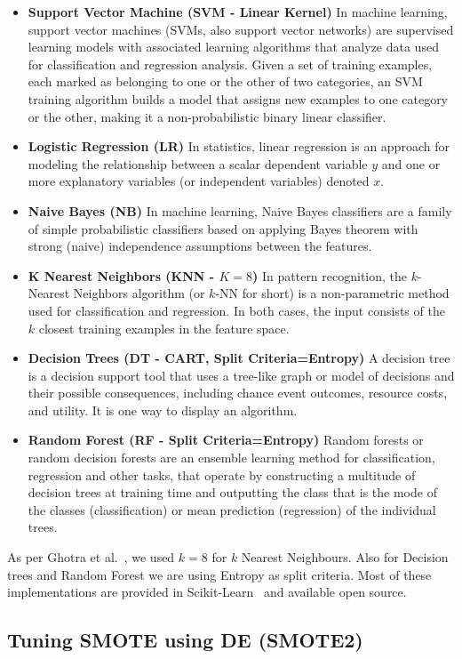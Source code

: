 \documentclass[sigconf,review, anonymous]{acmart}
\newcommand{\bi}{\begin{itemize}[leftmargin=0.4cm]}
\newcommand{\ei}{\end{itemize}}
\theoremstyle{break}
\theoremstyle{break}
\begin{document}
\bi
 \item \textbf{Support Vector Machine (SVM - Linear Kernel)}
 In machine learning, support vector machines (SVMs, also support vector networks) are supervised learning models with associated learning algorithms that analyze data used for classification and regression analysis. Given a set of training examples, each marked as belonging to one or the other of two categories, an SVM training algorithm builds a model that assigns new examples to one category or the other, making it a non-probabilistic binary linear classifier.
 \item \textbf{Logistic Regression (LR)}
 In statistics, linear regression is an approach for modeling the relationship between a scalar dependent variable $y$ and one or more explanatory variables (or independent variables) denoted $x$.
 \item \textbf{Naive Bayes (NB)}
 In machine learning, Naive Bayes classifiers are a family of simple probabilistic classifiers based on applying Bayes theorem with strong (naive) independence assumptions between the features.
 \item \textbf{K Nearest Neighbors (KNN - $K=8$)}
 In pattern recognition, the $k$-Nearest Neighbors algorithm (or $k$-NN for short) is a non-parametric method used for classification and regression. In both cases, the input consists of the $k$ closest training examples in the feature space.
 \item \textbf{Decision Trees (DT - CART, Split Criteria=Entropy)}
 A decision tree is a decision support tool that uses a tree-like graph or model of decisions and their possible consequences, including chance event outcomes, resource costs, and utility. It is one way to display an algorithm.
 \item \textbf{Random Forest (RF - Split Criteria=Entropy)}
 Random forests or random decision forests are an ensemble learning method for classification, regression and other tasks, that operate by constructing a multitude of decision trees at training time and outputting the class that is the mode of the classes (classification) or mean prediction (regression) of the individual trees. 
\ei

As per Ghotra et al.~\cite{ghotra2015revisiting}, we used $k=8$ for $k$ Nearest Neighbours. Also for Decision trees and Random Forest we are using Entropy as split criteria. Most of these implementations are provided in Scikit-Learn~\cite{pedregosa2011scikit} and available open source.

\subsection{\textbf{Tuning SMOTE using DE (SMOTE2)}}
\label{sect:tuning}
\end{document}
